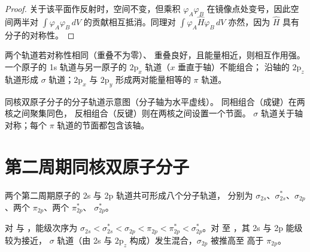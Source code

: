 \begin{proof}
关于该平面作反射时，空间不变，但乘积
$\varphi_A\varphi_B$ 在镜像点处变号，因此空间两半对
$\int\varphi_A\varphi_B\,dV$ 的贡献相互抵消。同理对
$\int\varphi_A\hat H\varphi_B\,dV$ 亦然，因为 $\hat H$ 具有分子的对称性。
\end{proof}

两个轨道若对称性相同（重叠不为零）、
重叠良好，且能量相近，则相互作用强。一个原子的 1s 轨道与另一原子的
$2\mathrm p_x$ 轨道（$x$ 垂直于轴）不能组合；
沿轴的 $2\mathrm p_z$ 轨道形成 $\sigma$ 轨道；$2\mathrm p_x$ 与
$2\mathrm p_y$ 形成两对能量相等的 $\pi$ 轨道。

\begin{omfigure}

{\small 同核双原子分子的分子轨道示意图（分子轴为水平虚线）。
同相组合（成键）在两核之间聚集同色，
反相组合（反键）则在两核之间设置一个节面。
$\sigma$ 轨道关于轴对称；每个 $\pi$
轨道的节面都包含该轴。}
\end{omfigure}

\section{第二周期同核双原子分子}

两个第二周期原子的 2s 与 2p 轨道共可形成八个分子轨道，
分别为 $\sigma_{2s}$、$\sigma^*_{2s}$、$\sigma_{2p}$、两个 $\pi_{2p}$、两个 $\pi^*_{2p}$、
$\sigma^*_{2p}$。

\begin{proposition}[s--p 混合]\label{prop:b2:diatomic-mos:sp-mixing}
对  与 ，能级次序为 $\sigma_{2s} < \sigma^*_{2s} < \sigma_{2p} < \pi_{2p} <
\pi^*_{2p} < \sigma^*_{2p}$。对  至 ，其 2s 与 2p 能级较为接近，
$\sigma$ 轨道（由 2s 与 $2\mathrm p_z$ 构成）发生混合，$\sigma_{2p}$ 被推高至
高于 $\pi_{2p}$。
\end{proposition}

